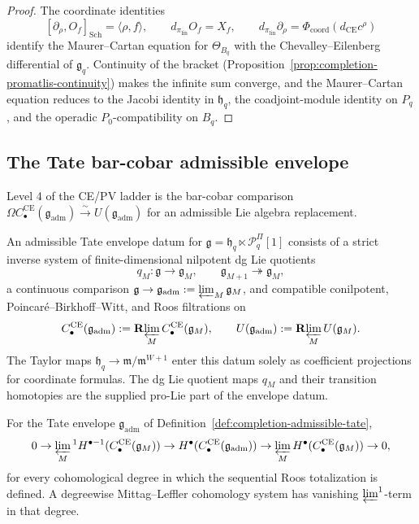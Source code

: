 \begin{proof}
The coordinate identities
\[
  [\partial_\rho,O_f]_{\mathrm{Sch}}
    =\langle\rho,f\rangle,
  \qquad
  d_{\pi_{\mathrm{lin}}}O_f=X_f,
  \qquad
  d_{\pi_{\mathrm{lin}}}\partial_\rho
    =\Phi_{\mathrm{coord}}(d_{\mathrm{CE}}c^\rho)
\]
identify the Maurer--Cartan equation for
\(\Theta_{B_q}\) with the Chevalley--Eilenberg differential of
\(\mathfrak g_q\).  Continuity of the bracket
(Proposition~\ref{prop:completion-promatlis-continuity}) makes the
infinite sum converge, and the Maurer--Cartan equation reduces to
the Jacobi identity in \(\mathfrak h_q\), the coadjoint-module
identity on \(P_q\), and the operadic \(P_0\)-compatibility on
\(B_q\).
\end{proof}

\subsection{The Tate bar-cobar admissible envelope}
\label{ssec:completion-tate-bar-cobar}

Level 4 of the CE/PV ladder is the bar-cobar comparison
\(\Omega C^{\mathrm{CE}}_\bullet(\mathfrak g_{\mathrm{adm}})\xrightarrow{\sim}
U(\mathfrak g_{\mathrm{adm}})\) for an admissible Lie algebra
replacement.

\begin{defn}
\label{def:completion-admissible-tate}
An admissible Tate envelope datum for
\(\mathfrak g=\mathfrak h_q\ltimes\mathcal P^\Pi_q[1]\) consists of
a strict inverse system of finite-dimensional nilpotent dg Lie
quotients
\[
  q_M\colon\mathfrak g\longrightarrow\mathfrak g_M,
  \qquad
  \mathfrak g_{M+1}\twoheadrightarrow\mathfrak g_M,
\]
a continuous comparison
\(\mathfrak g\to\mathfrak g_{\mathrm{adm}}
:=\varprojlim_M\mathfrak g_M\), and compatible conilpotent,
Poincar\'e--Birkhoff--Witt, and Roos filtrations on
\[
  C^{\mathrm{CE}}_\bullet(\mathfrak g_{\mathrm{adm}})
  :=\mathbf R\!\varprojlim_M
    C^{\mathrm{CE}}_\bullet(\mathfrak g_M),
  \qquad
  U(\mathfrak g_{\mathrm{adm}})
  :=\mathbf R\!\varprojlim_M U(\mathfrak g_M).
\]
The Taylor maps
\(\mathfrak h_q\to\mathfrak m/\mathfrak m^{W+1}\) enter this
datum solely as coefficient projections for coordinate formulas.
The dg Lie quotient maps \(q_M\) and their transition homotopies are
the supplied pro-Lie part of the envelope datum.
\end{defn}

\begin{lem}
\label{lem:completion-milnor-ce}
For the Tate envelope \(\mathfrak g_{\mathrm{adm}}\) of
Definition~\ref{def:completion-admissible-tate},
\[
  0\to\varprojlim_M{}^1H^{\bullet-1}(C^{\mathrm{CE}}_\bullet(\mathfrak g_M))
   \to H^\bullet(C^{\mathrm{CE}}_\bullet(\mathfrak g_{\mathrm{adm}}))
   \to\varprojlim_M H^\bullet(C^{\mathrm{CE}}_\bullet(\mathfrak g_M))
   \to 0,
\]
for every cohomological degree in which the sequential Roos
totalization is defined.  A degreewise Mittag--Leffler cohomology
system has vanishing \(\varprojlim^1\)-term in that degree.
\end{lem}


